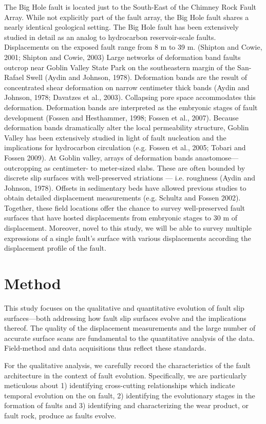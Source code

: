 \documentclass[12pt,a4paper]{article}
\begin{document}
The Big Hole fault is located just to the South-East of the Chimney Rock Fault Array. While not explicitly part of the fault array, the Big Hole fault shares a nearly identical geological setting. The Big Hole fault has been extensively studied in detail as an analog to hydrocarbon reservoir-scale faults. Displacements on the exposed fault range from 8 m to 39 m. (Shipton and Cowie, 2001; Shipton and Cowie, 2003) 
	Large networks of deformation band faults outcrop near Goblin Valley State Park on the southeastern margin of the San-Rafael Swell (Aydin and Johnson, 1978). Deformation bands are the result of concentrated shear deformation on narrow centimeter thick bands (Aydin and Johnson, 1978; Davatzes et al., 2003). Collapsing pore space accommodates this deformation. Deformation bands are interpreted as the embryonic stages of fault development (Fossen and Hesthammer, 1998; Fossen et al., 2007). Because deformation bands dramatically alter the local permeability structure, Goblin Valley has been extensively studied in light of fault nucleation and the implications for hydrocarbon circulation (e.g. Fossen et al., 2005; Tobari and Fossen 2009). At Goblin valley, arrays of deformation bands anastomose—outcropping as centimeter- to meter-sized slabs.  These are often bounded by discrete slip surfaces with well-preserved striations — i.e. roughness (Aydin and Johnson, 1978). Offsets in sedimentary beds have allowed previous studies to obtain detailed displacement measurements (e.g. Schultz and Fossen 2002). 
Together, these field locations offer the chance to survey well-preserved fault surfaces that have hosted displacements from embryonic stages to 30 m of displacement. Moreover, novel to this study, we will be able to survey multiple expressions of a single fault’s surface with various displacements according the displacement profile of the fault. 

\section{Method}

This study focuses on the qualitative and quantitative evolution of fault slip surfaces—both addressing how fault slip surfaces evolve and the implications thereof. The quality of the displacement measurements and the large number of accurate surface scans are fundamental to the quantitative analysis of the data. Field-method and data acquisitions thus reflect these standards. 

For the qualitative analysis, we carefully record the characteristics of the fault architecture in the context of fault evolution. Specifically, we are particularly meticulous about 1) identifying cross-cutting relationships which indicate temporal evolution on the on fault, 2) identifying the evolutionary stages in the formation of faults and 3) identifying and characterizing the wear product, or fault rock, produce as faults evolve. 
\end{document}
